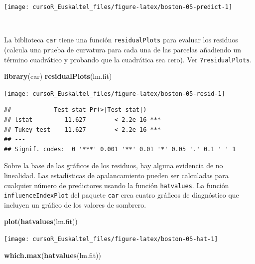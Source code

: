 \documentclass[]{book}
\newenvironment{Shaded}{\begin{snugshade}}{\end{snugshade}}
\newcommand{\KeywordTok}[1]{\textcolor[rgb]{0.13,0.29,0.53}{\textbf{#1}}}
\newcommand{\NormalTok}[1]{#1}
\begin{document}
\begin{center}\texttt{[image: cursoR\_Euskaltel\_files/figure-latex/boston-05-predict-1]} \end{center}

~

La biblioteca \texttt{car} tiene una función \texttt{residualPlots} para
evaluar los residuos (calcula una prueba de curvatura para cada una de
las parcelas añadiendo un término cuadrático y probando que la
cuadrática sea cero). Ver \texttt{?residualPlots}.

\begin{Shaded}
\begin{Highlighting}[]
\KeywordTok{library}\NormalTok{(car)}
\KeywordTok{residualPlots}\NormalTok{(lm.fit)}
\end{Highlighting}
\end{Shaded}

\begin{center}\texttt{[image: cursoR\_Euskaltel\_files/figure-latex/boston-05-resid-1]} \end{center}

\begin{verbatim}
##            Test stat Pr(>|Test stat|)    
## lstat         11.627        < 2.2e-16 ***
## Tukey test    11.627        < 2.2e-16 ***
## ---
## Signif. codes:  0 '***' 0.001 '**' 0.01 '*' 0.05 '.' 0.1 ' ' 1
\end{verbatim}

Sobre la base de las gráficos de los residuos, hay alguna evidencia de
no linealidad. Las estadísticas de apalancamiento pueden ser calculadas
para cualquier número de predictores usando la función
\texttt{hatvalues}. La función \texttt{influenceIndexPlot} del paquete
\texttt{car} crea cuatro gráficos de diagnóstico que incluyen un gráfico
de los valores de sombrero.

\begin{Shaded}
\begin{Highlighting}[]
\KeywordTok{plot}\NormalTok{(}\KeywordTok{hatvalues}\NormalTok{(lm.fit))}
\end{Highlighting}
\end{Shaded}

\begin{center}\texttt{[image: cursoR\_Euskaltel\_files/figure-latex/boston-05-hat-1]} \end{center}

\begin{Shaded}
\begin{Highlighting}[]
\KeywordTok{which.max}\NormalTok{(}\KeywordTok{hatvalues}\NormalTok{(lm.fit))}
\end{Highlighting}
\end{Shaded}
\end{document}
